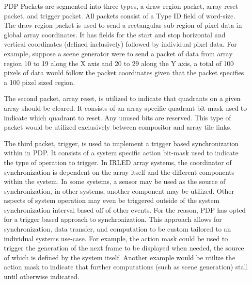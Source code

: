 PDP Packets are segmented into three types, a draw region packet, array reset packet, and trigger packet. All packets consist of a Type ID field of word-size. The draw region packet is used to send a rectangular sub-region of pixel data in global array coordinates. It has fields for the start and stop horizontal and vertical coordinates (defined inclusively) followed by individual pixel data. For example, suppose a scene generator were to send a packet of data from array region 10 to 19 along the X axis and 20 to 29 along the Y axis, a total of 100 pixels of data would follow the packet coordinates given that the packet specifies a 100 pixel sized region.

The second packet, array reset, is utilized to indicate that quadrants on a given array should be cleared. It consists of an array specific quadrant bit-mask used to indicate which quadrant to reset. Any unused bits are reserved. This type of packet would be utilized exclusively between compositor and array tile links.

The third packet, trigger, is used to implement a trigger based synchronization within in PDP. It consists of a system specific action bit-mask used to indicate the type of operation to trigger. In IRLED array systems, the coordinator of synchronization is dependent on the array itself and the different components within the system. In some systems, a sensor may be used as the source of synchronization, in other systems, another component may be utilized. Other aspects of system operation may even be triggered outside of the system synchronization interval based off of other events. For the reason, PDP has opted for a trigger based approach to synchronization. This approach allows for synchronization, data transfer, and computation to be custom tailored to an individual systems use-case. For example, the action mask could be used to trigger the generation of the next frame to be displayed when needed, the source of which is defined by the system itself. Another example would be utilize the action mask to indicate that further computations (such as scene generation) stall until otherwise indicated.

